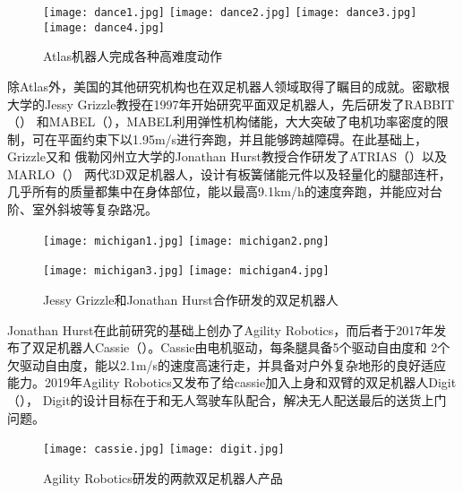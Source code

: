\begin{figure}[htbp]
    \centering
    \texttt{[image: dance1.jpg]}
    \texttt{[image: dance2.jpg]}
    \texttt{[image: dance3.jpg]}
    \texttt{[image: dance4.jpg]}
    \caption{\label{fig:atlas_dance}Atlas机器人完成各种高难度动作}
\end{figure}

除Atlas外，美国的其他研究机构也在双足机器人领域取得了瞩目的成就。密歇根大学的Jessy Grizzle教授在1997年开始研究平面双足机器人，先后研发了RABBIT（）
和MABEL（），MABEL利用弹性机构储能，大大突破了电机功率密度的限制，可在平面约束下以1.95m/s进行奔跑，并且能够跨越障碍。在此基础上，Grizzle又和
俄勒冈州立大学的Jonathan Hurst教授合作研发了ATRIAS\cite{rezazadeh2015toward}（）以及MARLO\cite{buss2014preliminary}（）
两代3D双足机器人，设计有板簧储能元件以及轻量化的腿部连杆，几乎所有的质量都集中在身体部位，能以最高9.1km/h的速度奔跑，并能应对台阶、室外斜坡等复杂路况。

\begin{figure}[htbp]
    \centering
        {%
            \texttt{[image: michigan1.jpg]}}
    \hspace{1in}
        {%
            \texttt{[image: michigan2.png]}}

        {%
            \texttt{[image: michigan3.jpg]}}
    \hspace{1in}
        {%
            \texttt{[image: michigan4.jpg]}}
    \caption{Jessy Grizzle和Jonathan Hurst合作研发的双足机器人\label{fig:michigan_biped}}
\end{figure}

Jonathan Hurst在此前研究的基础上创办了Agility Robotics，而后者于2017年发布了双足机器人Cassie\cite{Cassie}（）。Cassie由电机驱动，每条腿具备5个驱动自由度和
2个欠驱动自由度，能以2.1m/s的速度高速行走，并具备对户外复杂地形的良好适应能力。2019年Agility Robotics又发布了给cassie加入上身和双臂的双足机器人Digit\cite{Digit}（），
Digit的设计目标在于和无人驾驶车队配合，解决无人配送最后的送货上门问题。

\begin{figure}[htbp]
    \centering
        {%
            \texttt{[image: cassie.jpg]}}
    \hspace{1in}            
        {%
            \texttt{[image: digit.jpg]}}
    \caption{Agility Robotics研发的两款双足机器人产品\label{fig:michigan_biped}}
\end{figure}

